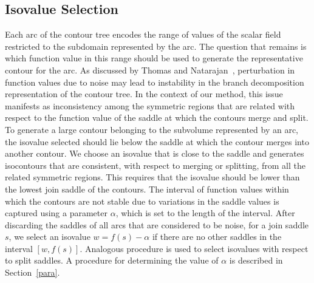 \documentclass[review,journal]{vgtc}         %
\begin{document}
\subsection{Isovalue Selection}
Each arc of the contour tree encodes the range
of values of the scalar field restricted to the subdomain represented by the arc.
The question that remains is which function value in this range should be used
to generate the representative contour for the arc. As discussed by 
Thomas and Natarajan~\cite{ThomN11}, perturbation in function values due to noise
may lead to instability in the branch decomposition representation of the contour tree.
In the context of our method, this issue manifests as inconsistency among the symmetric
regions that are related with respect to the function value of the saddle at which 
the contours merge and split. To generate a large contour belonging to the subvolume 
represented by an arc, the isovalue selected should lie below the saddle at which 
the contour merges into another contour. We choose an isovalue that is
close to the saddle and generates isocontours that are consistent, with respect to merging
or splitting, from all the related symmetric regions. This requires that the isovalue
should be lower than the lowest join saddle of the contours.
The interval of function values within which the contours are not stable due to
variations in the saddle values is captured using a parameter $\alpha$, which is set
to the length of the interval. After discarding the saddles of all arcs that are 
considered to be noise, for a join saddle $s$, we select an isovalue $w = f(s)-\alpha$
if there are no other saddles in the interval $[w,f(s)]$. Analogous procedure is
used to select isovalues with respect to split saddles. A procedure for determining
the value of $\alpha$ is described in Section~\ref{para}.
%
\end{document}
